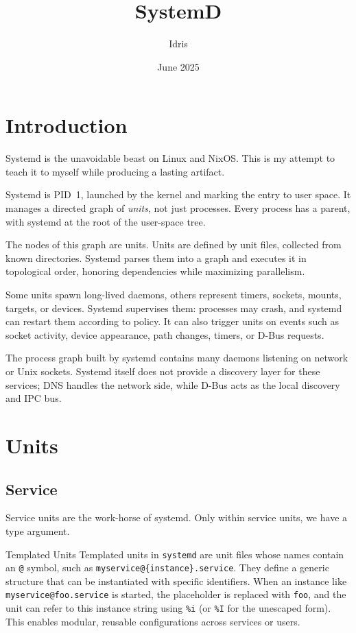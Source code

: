 \documentclass[openany, 12pt]{book}
\title{SystemD}
\author{Idris}
\date{June 2025}
\begin{document}
\tableofcontents
\listoftables

\frontmatter
\chapter{Introduction}
Systemd is the unavoidable beast on Linux and NixOS. This is my attempt to
teach it to myself while producing a lasting artifact.

Systemd is PID~1, launched by the kernel and marking the entry to user space.
It manages a directed graph of \emph{units}, not just processes. Every process
has a parent, with systemd at the root of the user-space tree.

The nodes of this graph are units. Units are defined by unit files, collected
from known directories. Systemd parses them into a graph and executes it in
topological order, honoring dependencies while maximizing parallelism.

Some units spawn long-lived daemons, others represent timers, sockets, mounts,
targets, or devices. Systemd supervises them: processes may crash, and systemd
can restart them according to policy. It can also trigger units on events such
as socket activity, device appearance, path changes, timers, or D-Bus requests.

The process graph built by systemd contains many daemons listening on network
or Unix sockets. Systemd itself does not provide a discovery layer for these
services; DNS handles the network side, while D-Bus acts as the local discovery
and IPC bus.


\mainmatter
\chapter{Units}
\section{Service}
Service units are the work-horse of systemd. Only within service units, we have
a type argument.

\begin{definition}{Templated Units}{}
  Templated units in \texttt{systemd} are unit files whose names contain an
  \texttt{@} symbol, such as \texttt{myservice@\{instance\}.service}. They define
  a generic structure that can be instantiated with specific identifiers. When an
  instance like \texttt{myservice@foo.service} is started, the placeholder is
  replaced with \texttt{foo}, and the unit can refer to this instance string using
  \texttt{\%i} (or \texttt{\%I} for the unescaped form). This enables modular,
  reusable configurations across services or users.
\end{definition}
\end{document}
